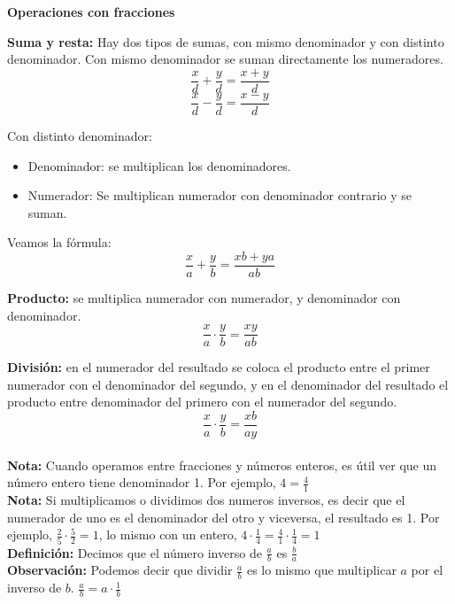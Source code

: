 \documentclass{article}
\begin{document}
\begin{normalsize}
\begin{center}
\textbf{Operaciones con fracciones}
\end{center}
\end{normalsize}

\begin{small}
\textbf{Suma y resta:} Hay dos tipos de sumas, con mismo denominador y con distinto denominador.
Con mismo denominador se suman directamente los numeradores.
\[\frac{x}{d}+\frac{y}{d}=\frac{x+y}{d}\]
\[\frac{x}{d}-\frac{y}{d}=\frac{x-y}{d}\]

Con distinto denominador:
\begin{itemize}
	\item Denominador: se multiplican los denominadores.
	\item Numerador: Se multiplican numerador con denominador contrario y se suman.
\end{itemize}
Veamos la fórmula:
\[\frac{x}{a}+\frac{y}{b}=\frac{xb+ya}{ab}\]

\textbf{Producto:} se multiplica numerador con numerador, y denominador con denominador.
\[\frac{x}{a}\cdot\frac{y}{b}=\frac{xy}{ab}\]

\textbf{División:} en el numerador del resultado se coloca el producto entre el primer numerador con el denominador del segundo, y en el denominador del resultado el producto entre denominador del primero con el numerador del segundo.
\[\frac{x}{a}\cdot\frac{y}{b}=\frac{xb}{ay}\]\\

\textbf{Nota:} Cuando operamos entre fracciones y números enteros, es útil ver que un número entero tiene denominador 1. Por ejemplo, $4=\frac{4}{1}$\\

\textbf{Nota:} Si multiplicamos o dividimos dos numeros inversos, es decir que el numerador de uno es el denominador del otro y viceversa, el resultado es 1. Por ejemplo, $\frac{2}{5}\cdot\frac{5}{2}=1$, lo mismo con un entero, $4\cdot\frac{1}{4}=\frac{4}{1}\cdot\frac{1}{4}=1$\\

\textbf{Definición:} Decimos que el número inverso de $\frac{a}{b}$ es $\frac{b}{a}$\\

\textbf{Observación:} Podemos decir que dividir $\frac{a}{b}$ es lo mismo que multiplicar $a$ por el inverso de $b$. $\frac{a}{b}=a\cdot\frac{1}{b}$\\
\end{small}
\end{document}
